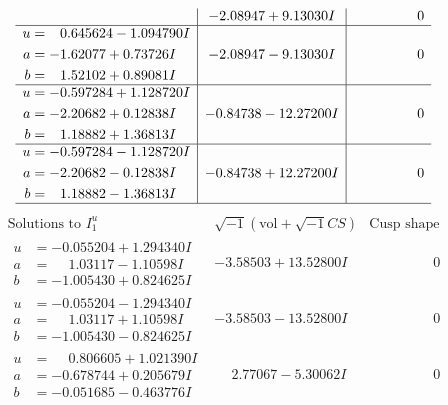 \documentclass[1p]{elsarticle_modified}
\theoremstyle{definition}
\newcommand{\I}{\sqrt{-1}}
\begin{document}
$$\begin{array}{c|c|c}
 & -2.08947 + 9.13030 I & \phantom{-0.000000 } 0 \\ \hline\begin{aligned}
u &= \phantom{-}0.645624 - 1.094790 I \\
a &= -1.62077 + 0.73726 I \\
b &= \phantom{-}1.52102 + 0.89081 I\end{aligned}
 & -2.08947 - 9.13030 I & \phantom{-0.000000 } 0 \\ \hline\begin{aligned}
u &= -0.597284 + 1.128720 I \\
a &= -2.20682 + 0.12838 I \\
b &= \phantom{-}1.18882 + 1.36813 I\end{aligned}
 & -0.84738 - 12.27200 I & \phantom{-0.000000 } 0 \\ \hline\begin{aligned}
u &= -0.597284 - 1.128720 I \\
a &= -2.20682 - 0.12838 I \\
b &= \phantom{-}1.18882 - 1.36813 I\end{aligned}
 & -0.84738 + 12.27200 I & \phantom{-0.000000 } 0\\
 \hline 
 \end{array}$$\newpage$$\begin{array}{c|c|c}  
\text{Solutions to }I^u_{1}& \I (\text{vol} + \sqrt{-1}CS) & \text{Cusp shape}\\
 \hline 
\begin{aligned}
u &= -0.055204 + 1.294340 I \\
a &= \phantom{-}1.03117 - 1.10598 I \\
b &= -1.005430 + 0.824625 I\end{aligned}
 & -3.58503 + 13.52800 I & \phantom{-0.000000 } 0 \\ \hline\begin{aligned}
u &= -0.055204 - 1.294340 I \\
a &= \phantom{-}1.03117 + 1.10598 I \\
b &= -1.005430 - 0.824625 I\end{aligned}
 & -3.58503 - 13.52800 I & \phantom{-0.000000 } 0 \\ \hline\begin{aligned}
u &= \phantom{-}0.806605 + 1.021390 I \\
a &= -0.678744 + 0.205679 I \\
b &= -0.051685 - 0.463776 I\end{aligned}
 & \phantom{-}2.77067 - 5.30062 I & \phantom{-0.000000 } 0 \\ \hline\begin{aligned}

\end{aligned}
\end{array}$$
\end{document}
